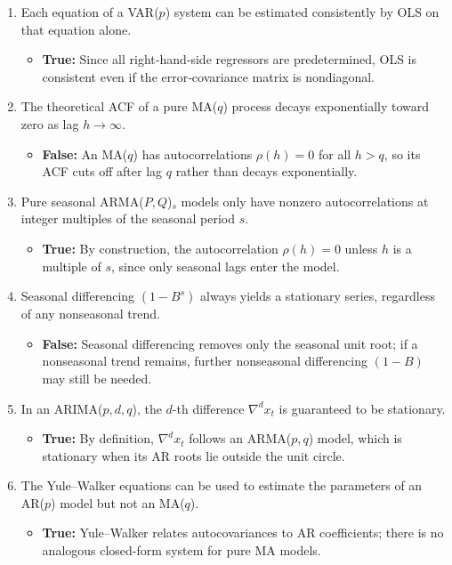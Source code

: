 \documentclass[11pt]{article}
\begin{document}
\begin{enumerate}
  \item Each equation of a VAR($p$) system can be estimated consistently by OLS on that equation alone.
  \begin{itemize}
    \item \textbf{True:} Since all right‐hand‐side regressors are predetermined, OLS is consistent even if the error‐covariance matrix is nondiagonal.
  \end{itemize}

    \item The theoretical ACF of a pure MA($q$) process decays exponentially toward zero as lag $h\to\infty$.
  \begin{itemize}
    \item \textbf{False:} An MA($q$) has autocorrelations $\rho(h)=0$ for all $h>q$, so its ACF cuts off after lag $q$ rather than decays exponentially.
  \end{itemize}

  \item Pure seasonal ARMA($P,Q$)$_s$ models only have nonzero autocorrelations at integer multiples of the seasonal period $s$.
  \begin{itemize}
    \item \textbf{True:} By construction, the autocorrelation $\rho(h)=0$ unless $h$ is a multiple of $s$, since only seasonal lags enter the model.
  \end{itemize}

  \item Seasonal differencing $(1 - B^s)$ always yields a stationary series, regardless of any nonseasonal trend.
  \begin{itemize}
    \item \textbf{False:} Seasonal differencing removes only the seasonal unit root; if a nonseasonal trend remains, further nonseasonal differencing $(1 - B)$ may still be needed.
  \end{itemize}

  \item In an ARIMA($p,d,q$), the $d$-th difference $\nabla^d x_t$ is guaranteed to be stationary.
  \begin{itemize}
    \item \textbf{True:} By definition, $\nabla^d x_t$ follows an ARMA($p,q$) model, which is stationary when its AR roots lie outside the unit circle.
  \end{itemize}

  \item The Yule–Walker equations can be used to estimate the parameters of an AR($p$) model but not an MA($q$).
  \begin{itemize}
    \item \textbf{True:} Yule–Walker relates autocovariances to AR coefficients; there is no analogous closed-form system for pure MA models.
  \end{itemize}


\end{enumerate}
\end{document}
